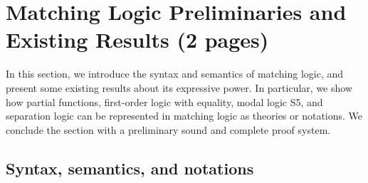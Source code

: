 \documentclass{amsart}
\begin{document}
\section{Matching Logic Preliminaries and Existing Results (2 pages)}

In this section, we introduce the syntax and semantics of matching logic,
and present some existing results about its expressive power.
In particular, we show how
partial functions,
first-order logic with equality,
modal logic S5,
and separation logic can be represented in matching logic
as theories or notations.
We conclude the section with a preliminary sound and complete proof system.

\subsection{Syntax, semantics, and notations}
\label{sec_syntax_semantics_notations}
\end{document}
